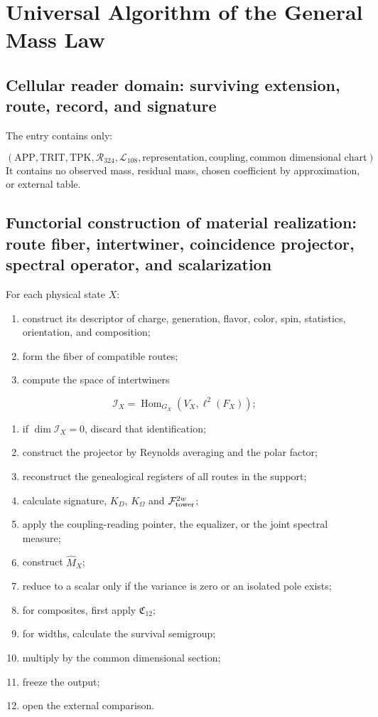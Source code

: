 \section{Universal Algorithm of the General Mass Law}
\subsection{Cellular reader domain: surviving extension, route, record, and signature}
The entry contains only:

\[
 (\mathrm{APP},\mathrm{TRIT},\mathrm{TPK},
 \mathcal R_{324},\mathcal L_{108},
 \text{representation},\text{coupling},
 \text{common dimensional chart}).
\]
It contains no observed mass, residual mass, chosen coefficient by approximation, or external table.

\subsection{Functorial construction of material realization: route fiber, intertwiner, coincidence projector, spectral operator, and scalarization}
For each physical state \(X\):

\begin{enumerate}
\item construct its descriptor of charge, generation, flavor, color, spin, statistics,
orientation, and composition;

\item form the fiber of compatible routes;
\item compute the space of intertwiners
\end{enumerate}
   \[
   \mathscr I_X=
   \operatorname{Hom}_{G_X}(V_X,\ell^2(F_X));
   \]
\begin{enumerate}
\item if \(\dim\mathscr I_X=0\), discard that identification;
\item construct the projector by Reynolds averaging and the polar factor;
\item reconstruct the genealogical registers of all routes in the support;
\item calculate signature, \(K_D\), \(K_\Omega\) and
\(\mathcal F_{\rm tower}^{2w}\);

\item apply the coupling-reading pointer, the equalizer, or the joint
spectral measure;

\item construct \(\widehat M_X\);
\item reduce to a scalar only if the variance is zero or an isolated pole exists;
\item for composites, first apply \(\mathfrak C_{12}\);
\item for widths, calculate the survival semigroup;
\item multiply by the common dimensional section;
\item freeze the output;
\item open the external comparison.
\end{enumerate}
